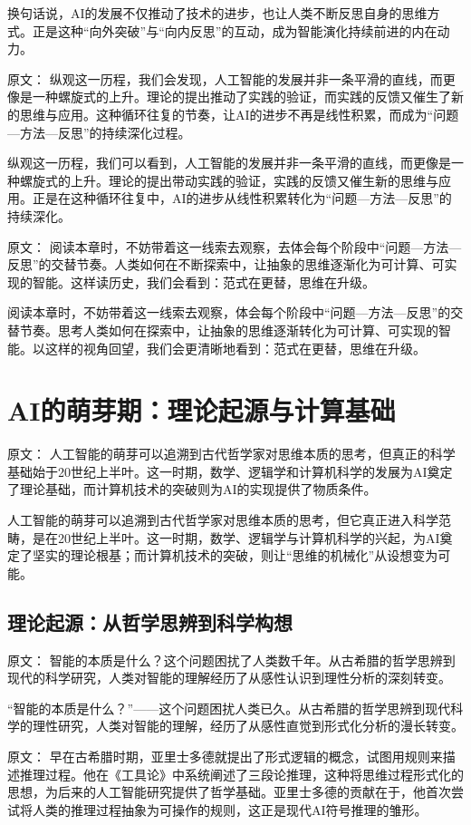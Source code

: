 换句话说，AI的发展不仅推动了技术的进步，也让人类不断反思自身的思维方式。正是这种“向外突破”与“向内反思”的互动，成为智能演化持续前进的内在动力。

原文：
纵观这一历程，我们会发现，人工智能的发展并非一条平滑的直线，而更像是一种螺旋式的上升。理论的提出推动了实践的验证，而实践的反馈又催生了新的思维与应用。这种循环往复的节奏，让AI的进步不再是线性积累，而成为“问题—方法—反思”的持续深化过程。

纵观这一历程，我们可以看到，人工智能的发展并非一条平滑的直线，而更像是一种螺旋式的上升。理论的提出带动实践的验证，实践的反馈又催生新的思维与应用。正是在这种循环往复中，AI的进步从线性积累转化为“问题—方法—反思”的持续深化。

原文：
阅读本章时，不妨带着这一线索去观察，去体会每个阶段中“问题—方法—反思”的交替节奏。人类如何在不断探索中，让抽象的思维逐渐化为可计算、可实现的智能。这样读历史，我们会看到：范式在更替，思维在升级。

阅读本章时，不妨带着这一线索去观察，体会每个阶段中“问题—方法—反思”的交替节奏。思考人类如何在探索中，让抽象的思维逐渐转化为可计算、可实现的智能。以这样的视角回望，我们会更清晰地看到：范式在更替，思维在升级。

\section{AI的萌芽期：理论起源与计算基础}

原文：
人工智能的萌芽可以追溯到古代哲学家对思维本质的思考，但真正的科学基础始于20世纪上半叶。这一时期，数学、逻辑学和计算机科学的发展为AI奠定了理论基础，而计算机技术的突破则为AI的实现提供了物质条件。

人工智能的萌芽可以追溯到古代哲学家对思维本质的思考，但它真正进入科学范畴，是在20世纪上半叶。这一时期，数学、逻辑学与计算机科学的兴起，为AI奠定了坚实的理论根基；而计算机技术的突破，则让“思维的机械化”从设想变为可能。

\subsection{理论起源：从哲学思辨到科学构想}

原文：
智能的本质是什么？这个问题困扰了人类数千年。从古希腊的哲学思辨到现代的科学研究，人类对智能的理解经历了从感性认识到理性分析的深刻转变。

“智能的本质是什么？”——这个问题困扰人类已久。从古希腊的哲学思辨到现代科学的理性研究，人类对智能的理解，经历了从感性直觉到形式化分析的漫长转变。

原文：
早在古希腊时期，亚里士多德就提出了形式逻辑的概念，试图用规则来描述推理过程。他在《工具论》中系统阐述了三段论推理，这种将思维过程形式化的思想，为后来的人工智能研究提供了哲学基础。亚里士多德的贡献在于，他首次尝试将人类的推理过程抽象为可操作的规则，这正是现代AI符号推理的雏形。

